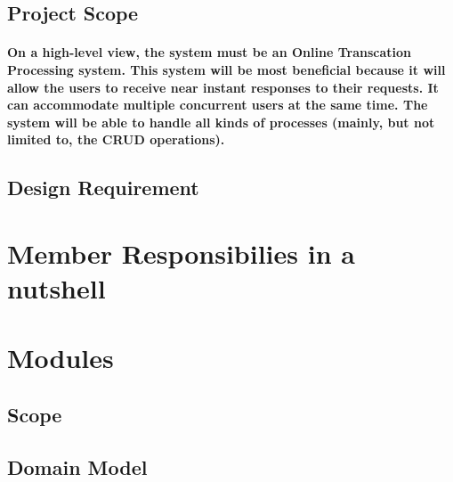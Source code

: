 \documentclass[12pt]{article}
\begin{document}
\paragraph{}

\subsection{Project Scope}
\paragraph{On a high-level view, the system must be an Online Transcation Processing system. This system will be most beneficial because it will allow the users to receive near instant responses to their requests. It can accommodate multiple concurrent users at the same time. The system will be able to handle all kinds of processes (mainly, but not limited to, the CRUD operations).}

\subsection{Design Requirement}
\paragraph{}

\section{Member Responsibilies in a nutshell}
\paragraph{}

\section{Modules}
\paragraph{}

\subsection{Scope}
\paragraph{}

\subsection{Domain Model}
\end{document}

